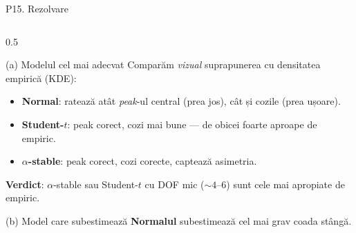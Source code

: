 \documentclass[9pt, aspectratio=169, t]{beamer}
\begin{document}
\begin{frame}[shrink=22]{P15. Rezolvare}
\begin{columns}[T]
\begin{column}{0.5\textwidth}
\begin{block}{(a) Modelul cel mai adecvat}
Comparăm \emph{vizual} suprapunerea cu densitatea empirică (KDE):
\begin{itemize}\setlength{\itemsep}{0pt}
\item \textbf{Normal}: ratează atât \emph{peak}-ul central (prea jos), cât și cozile (prea ușoare).
\item \textbf{Student-$t$}: peak corect, cozi mai bune --- de obicei foarte aproape de empiric.
\item \textbf{$\alpha$-stable}: peak corect, cozi corecte, captează asimetria.
\end{itemize}
\textbf{Verdict}: $\alpha$-stable sau Student-$t$ cu DOF mic ($\sim 4$--6) sunt cele mai apropiate de empiric.
\end{block}
\begin{block}{(b) Model care subestimează}
\textbf{Normalul} subestimează cel mai grav coada stângă.


\end{block}
\end{column}
\end{columns}
\end{frame}
\end{document}

